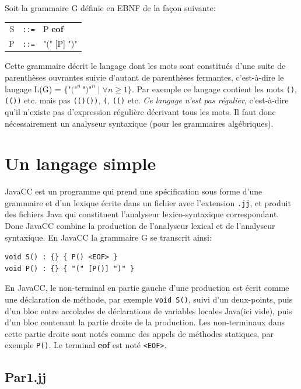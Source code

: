 \documentclass[11pt,a4paper]{article}
\newcommand{\assign}{\mbox{\texttt{::=}}\xspace}
\newcommand{\Java}{\textsf{Java}\xspace}
\newcommand{\JavaCC}{\textsf{JavaCC}\xspace}
\newcommand{\eof}{\textsf{\textbf{eof}}\xspace}
\begin{document}
\medskip

\noindent
Soit la grammaire G définie en EBNF de la façon suivante:

\begin{center}
\begin{tabular}{rcl}
    S
  & \assign
  & P \eof\\
    P
  & \assign
  & \textsf{"("} [P] \textsf{")"}
\end{tabular}
\end{center}

\noindent Cette grammaire décrit le langage dont les mots sont
constitués d'une suite de parenthèses ouvrantes suivie d'autant de
parenthèses fermantes, c'est-à-dire le langage L(G) =
$\{\textsf{"("}^{n} \, \textsf{")"}^{n} \mid \forall n \geq 1\}$. Par
exemple ce langage contient les mots \verb+()+, \verb+(())+ etc. mais
pas \verb+(()())+, \verb+(+, \verb+(()+ etc. \emph{Ce langage n'est
pas régulier}, c'est-à-dire qu'il n'existe pas d'expression régulière
décrivant tous les mots. Il faut donc nécessairement un analyseur
syntaxique (pour les grammaires algébriques).

\section{Un langage simple}

\JavaCC est un programme qui prend une spécification sous forme d'une
grammaire et d'un lexique écrite dans un fichier avec l'extension
\texttt{.jj}, et produit des fichiers \Java qui constituent
l'analyseur lexico-syntaxique correspondant. Donc \JavaCC combine la
production de l'analyseur lexical et de l'analyseur syntaxique. En
\JavaCC la grammaire G se transcrit ainsi:

{\small
\begin{verbatim}
void S() : {} { P() <EOF> }
void P() : {} { "(" [P()] ")" }
\end{verbatim}
}

\noindent En \JavaCC, le non-terminal en partie gauche d'une
production est écrit comme une déclaration de méthode, par exemple
\texttt{void S()}, suivi d'un deux-points, puis d'un bloc entre
accolades de déclarations de variables locales \Java (ici vide), puis
d'un bloc contenant la partie droite de la production. Les
non-terminaux dans cette partie droite sont notés comme des appels de
méthodes statiques, par exemple \texttt{P()}. Le terminal \eof est
noté \verb+<EOF>+.

\subsection{Par1.jj}
\end{document}
